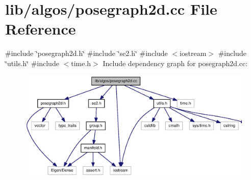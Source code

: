 \section{lib/algos/posegraph2d.cc \-File \-Reference}
\label{posegraph2d_8cc}
{\ttfamily \#include \char`\"{}posegraph2d.\-h\char`\"{}}\*
{\ttfamily \#include \char`\"{}se2.\-h\char`\"{}}\*
{\ttfamily \#include $<$iostream$>$}\*
{\ttfamily \#include \char`\"{}utils.\-h\char`\"{}}\*
{\ttfamily \#include $<$time.\-h$>$}\*
\-Include dependency graph for posegraph2d.\-cc\-:\nopagebreak
\begin{figure}[H]
\begin{center}
\leavevmode
\includegraphics[width=350pt]{posegraph2d_8cc__incl}
\end{center}
\end{figure}
